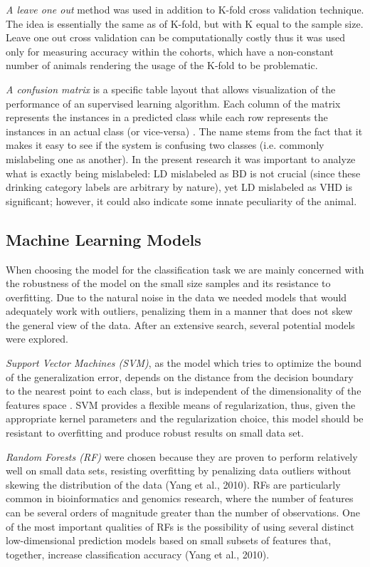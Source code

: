 	\textit{A leave one out} method was used in addition to K-fold cross validation technique. The idea is essentially the same as of K-fold, but with K equal to the sample size. Leave one out cross validation can be computationally costly thus it was used only for measuring accuracy within the cohorts, which have a non-constant number of animals rendering the usage of the K-fold to be problematic. 
	 
	\textit{A confusion matrix} is a specific table layout that allows visualization of the performance of an supervised learning algorithm. Each column of the matrix represents the instances in a predicted class while each row represents the instances in an actual class (or vice-versa) . The name stems from the fact that it makes it easy to see if the system is confusing two classes (i.e. commonly mislabeling one as another). In the present research it was important to analyze what is exactly being mislabeled: LD mislabeled as BD is not crucial (since these drinking category labels are arbitrary by nature), yet LD mislabeled as VHD is significant; however, it could also indicate some innate peculiarity of the animal.  
	
	\subsection{Machine Learning Models \label{section:ml-models}}
	When choosing the model for the classification task we are mainly concerned with the robustness of the model on the small size samples and its resistance to overfitting. Due to the natural noise in the data we needed models that would adequately work with outliers, penalizing them in a manner that does not skew the general view of the data. After an extensive search, several potential models were explored.
	
	\textit{Support Vector Machines (SVM)}, as the model which tries to optimize the bound of the generalization error, depends on the distance from the decision boundary to the nearest point to each class, but is independent of the dimensionality of the features space . SVM provides a flexible means of regularization, thus, given the appropriate kernel parameters and the regularization choice, this model should be resistant to overfitting and produce robust results on small data set.
	
	\textit{Random Forests (RF)} were chosen because they are proven to perform relatively well on small data sets, resisting overfitting by penalizing data outliers without skewing the distribution of the data (Yang et al., 2010). RFs are particularly common in bioinformatics and genomics research, where the number of features can be several orders of magnitude greater than the number of observations. One of the most important qualities of RFs is the possibility of using several distinct low-dimensional prediction models based on small subsets of features that, together, increase classification accuracy (Yang et al., 2010). 
	
